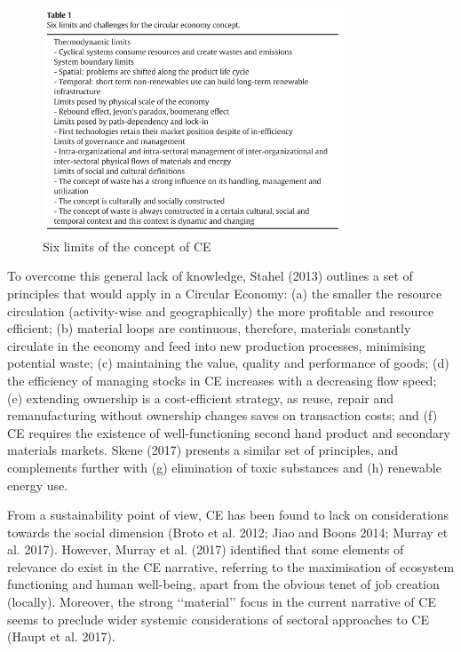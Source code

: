 \begin{figure}[h!]
    \centering
    \includegraphics[width=0.8\textwidth]{sections/asset/limits.PNG}
    \caption{Six limits of the concept of CE}
    \label{fig:ce_limits}
\end{figure}


\parencite{Stahel2013}


To overcome this general lack of knowledge, Stahel (2013) outlines a set of principles that would apply in a Circular Economy: (a) the smaller the resource circulation (activity-wise and geographically) the more profitable and resource efficient; (b) material loops are continuous, therefore, materials constantly circulate in the economy and feed into new production processes, minimising potential waste; (c) maintaining the value, quality and performance of goods; (d) the efficiency of managing stocks in CE increases with a decreasing flow speed; (e) extending ownership is a cost-efficient strategy, as reuse, repair and remanufacturing without ownership changes saves on transaction costs; and (f) CE requires the existence of well-functioning second hand product and secondary materials markets. Skene (2017) presents a similar set of principles, and complements further with (g) elimination of toxic substances and (h) renewable energy use.



\parencite{Milios2018}
From a sustainability point of view, CE has been found to lack on considerations towards the social dimension (Broto et al. 2012; Jiao and Boons 2014; Murray et al. 2017). However, Murray et al. (2017) identified that some elements of relevance do exist in the CE narrative, referring to the maximisation of ecosystem functioning and human well-being, apart from the obvious tenet of job creation (locally). Moreover, the strong ‘‘material’’ focus in the current narrative of CE seems to preclude wider systemic considerations of sectoral approaches to CE (Haupt et al. 2017). 

